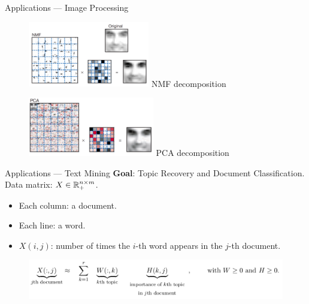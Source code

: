 \begin{frame}{Applications --- Image Processing}
    \begin{figure}[h!]
        \centering
        \begin{minipage}{0.45\textwidth}
            \centering
            \includegraphics[width=5.3cm]{../images/NMFcomp.png}
            NMF decomposition
        \end{minipage}
        \hfill
        \begin{minipage}{0.45\textwidth}
            \centering
            \includegraphics[width=5.5cm]{../images/PCAcomp.png}
            PCA decomposition
        \end{minipage}
    \end{figure}
\end{frame}
\begin{frame}{Applications --- Text Mining}
    \textbf{Goal}: Topic Recovery and Document Classification.\\
    \vspace{0.7cm}
    Data matrix: $X\in\mathbb{R}^{n\times m}_+$.\\
    \begin{itemize}
        \item Each column: a document.
        \item Each line: a word.
        \item $X(i,j)$: number of times the $i$-th word appears in the $j$-th document.
    \end{itemize}
    \begin{figure}
        \centering
        \includegraphics[width=0.9\linewidth]{../images/NMF_app2.png}
    \end{figure}
\end{frame}
